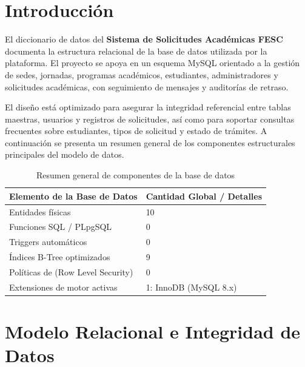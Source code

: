 \documentclass[12pt,letterpaper]{article}
\providecommand{\toprule}{}
\providecommand{\midrule}{}
\renewcommand{\toprule}{\hline}
\renewcommand{\midrule}{\hline}
\newcommand{\code}[1]{\texorpdfstring{\begingroup\normalfont\normalsize\def\_{\textunderscore\allowbreak}#1\endgroup}{#1}}
\begin{document}
\newpage
{}
\listoffigures

\section*{Introducción}

El diccionario de datos del \textbf{Sistema de Solicitudes Académicas FESC} documenta la estructura relacional de la base de datos utilizada por la plataforma. El proyecto se apoya en un esquema MySQL orientado a la gestión de sedes, jornadas, programas académicos, estudiantes, administradores y solicitudes académicas, con seguimiento de mensajes y auditorías de retraso.

El diseño está optimizado para asegurar la integridad referencial entre tablas maestras, usuarios y registros de solicitudes, así como para soportar consultas frecuentes sobre estudiantes, tipos de solicitud y estado de trámites. A continuación se presenta un resumen general de los componentes estructurales principales del modelo de datos.

\begin{longtable}{|L{0.42\textwidth}|L{0.48\textwidth}|}
\caption{Resumen general de componentes de la base de datos}\\
\toprule
\textbf{Elemento de la Base de Datos} & \textbf{Cantidad Global / Detalles} \\
\midrule
Entidades físicas & 10 \\
\hline
Funciones SQL / PLpgSQL & 0 \\
\hline
Triggers automáticos & 0 \\
\hline
Índices B-Tree optimizados & 9 \\
\hline
Políticas de (Row Level Security) & 0 \\
\hline
Extensiones de motor activas & 1: \code{InnoDB} (MySQL 8.x) \\
\hline
\end{longtable}

\section{Modelo Relacional e Integridad de Datos}
\end{document}
